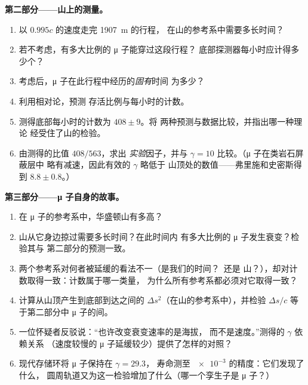 \begin{problem}
\medskip\noindent\textbf{第二部分——山上的测量。}
\begin{enumerate}[resume]
  \item 以 $0.995c$ 的速度走完 \qty{1907}{m} 的行程，
        在山的参考系中需要多长时间？
  \item 若不考虑，有多大比例的 μ 子能穿过这段行程？
        底部探测器每小时应计得多少个？
  \item 考虑后，μ 子在此行程中经历的\emph{固有}时间
        为多少？
  \item 利用相对论，预测
        存活比例与每小时的计数。
  \item 测得底部每小时的计数为 $408 \pm 9$。将
        两种预测与数据比较，并指出哪一种理论
        经受住了山的检验。
  \item 由测得的比值 $408/563$，求出
        \emph{实验}因子，并与
        $\gamma = 10$ 比较。（μ 子在类岩石屏蔽层中
        略有减速，因此有效的 $\gamma$ 略低于
        山顶处的数值——弗里施和史密斯得到 $8.8 \pm
        0.8$。）
\end{enumerate}

\medskip\noindent\textbf{第三部分——μ 子自身的故事。}
\begin{enumerate}[resume]
  \item 在 μ 子的参考系中，华盛顿山有多高？
  \item 山从它身边掠过需要多长时间？在此时间内
        有多大比例的 μ 子发生衰变？检验其与
        第二部分的预测一致。
  \item 两个参考系对何者被延缓的看法不一（是我们的时间？\ 还是
        山？），却对计数取得一致：计数属于哪一类量，
        为什么所有参考系都必须对它取得一致？
  \item 计算从山顶产生到底部到达之间的
         $\Delta s^2$（在山的参考系中），并检验
        $\Delta s/c$ 等于第二部分中 μ 子的间。
  \item 一位怀疑者反驳说：“也许改变衰变速率的是海拔，
        而不是速度。”测得的 $\gamma$ 依赖关系
        （速度较慢的 μ 子延缓较少）提供了怎样的对照？
  \item 现代存储环将 μ 子保持在 $\gamma = 29.3$，
        寿命测至 $\num{e-3}$ 的精度：它们发现了什么，
        圆周轨道又为这一检验增加了什么（哪一个孪生子是
        μ 子？）
\end{enumerate}


\end{problem}
